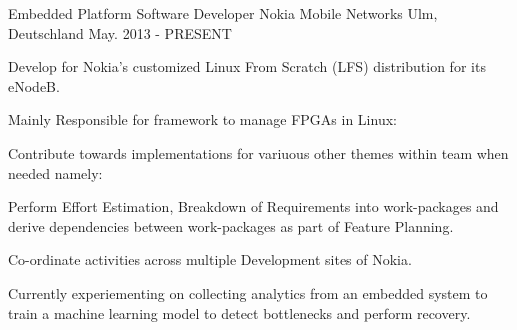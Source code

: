   \cventry
    {Embedded Platform Software Developer} %
    {Nokia Mobile Networks} %
    {Ulm, Deutschland} %
    {May. 2013 - PRESENT} %
    {
      \begin{cvitems} %
      \item {Develop for  Nokia's customized Linux From Scratch (LFS) distribution for its eNodeB.}
      \item {Mainly Responsible for framework to manage FPGAs in Linux:}
	\item {Contribute towards implementations for variuous other themes within team when needed namely:}
	\item {Perform Effort Estimation, Breakdown of Requirements into work-packages and derive dependencies between work-packages as part of Feature Planning.}
	\item {Co-ordinate activities across multiple Development sites of Nokia.}
	\item {Currently experiementing on collecting analytics from an embedded system to train a machine learning model to detect bottlenecks and perform recovery.}
      \end{cvitems}
  }
